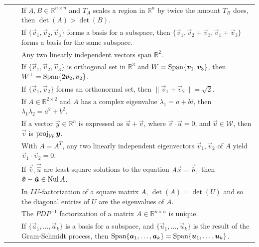 \begin{table}[!h]
\begin{tabular}{c@{\hspace{2.5em}}cp{}}
			\bubble & \dbubble & If \(A, B \in \mathbb{R}^{n \times n}\) and \(T_A\) scales a region in \(\mathbb{R}^n\) by twice the amount 
						      \(T_B\) does, then \(\det(A) > \det(B)\). \\[0.75em]
			\dbubble & \bubble & If \(\{\vec{v}_1, \vec{v}_2, \vec{v}_3\}\) forms a basis for a subspace, then 
						      \(\{\vec{v}_1, \vec{v}_2 + \vec{v}_3, \vec{v}_1 + \vec{v}_3\}\) forms a basis for the same subspace.\\[0.75em]
			\bubble & \dbubble & Any two linearly independent vectors span \(\mathbb{R}^2.\) \\[0.75em]
			\dbubble & \bubble & If \(\{\vec{v}_1, \vec{v}_2, \vec{v}_3\}\) is orthogonal set in \(\mathbb{R}^3\) and 
						     \(W = \operatorname{Span}\{\bm{v}_1, \bm{v}_3\}\), then \(W^\perp = \operatorname{Span}\{2\bm{v}_2, \bm{v}_2\}\). \\[0.75em]
			\dbubble & \bubble & If \(\{\vec{v}_1, \vec{v}_2\}\) forms an orthonormal set, then \(\|\vec{v}_1 + \vec{v}_2\| = \sqrt{2}\). \\[0.75em]
			\dbubble & \bubble & If \(A \in \mathbb{R}^{2 \times 2}\) and \(A\) has a complex eigenvalue \(\lambda_1 = a + bi\), 
						      then \(\lambda_1\lambda_2 = a^2 + b^2\). \\[0.75em]
			\bubble & \dbubble & If a vector \(\vec{y} \in \mathbb{R}^n\) is expressed as \(\vec{u} + \vec{v}\), where \(\vec{v} \cdot \vec{u} = 0\), 
						      and \(\vec{u} \in \mathcal{W}\), then \(\vec{v}\) is \(\operatorname{proj}_\mathcal{W} \bm{y}\). \\[0.75em]
			\bubble & \dbubble & With \(A = A^T\), any two linearly independent eigenvectors \(\vec{v}_1, \vec{v}_2\) of \(A\) yield 
						     \(\vec{v}_1 \cdot \vec{v}_2 = 0\).\\[0.75em]
			\dbubble & \bubble & If \(\vec{\hat{v}}, \vec{\hat{u}}\) are least-square solutions to the equation \(A\vec{x} = \vec{b},\) then 
						      \(\bm{\hat{v}} - \bm{\hat{u}} \in \operatorname{Nul} A\).\\[0.75em]
			\bubble & \dbubble & In \(LU\)-factorization of a square matrix \(A\), \(\det(A) = \det(U)\) and so the diagonal entries of \(U\) are the 
						      eigenvalues of \(A\). \\[0.75em]
			\bubble & \dbubble & The \(PDP^{-1}\) factorization of a matrix \(A \in \mathbb{R}^{n \times n}\) is unique. \\[0.75em]
			\dbubble & \bubble & If \(\{\vec{a}_1, \dots, \vec{a}_k\}\) is a basis for a subspace, and 
						      \(\{\vec{u}_1, \dots, \vec{u}_k\}\) is the result of the Gram-Schmidt process, then 
						     \(\operatorname{Span} \{\bm{a}_1, \dots, \bm{a}_k\} = \operatorname{Span}\{\bm{u}_1, \dots, \bm{u}_k\}\). \\[0.75em]
			\bottomrule
		\end{tabular}
	\end{table}


